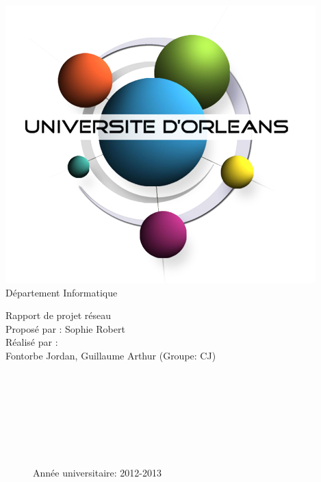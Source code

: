 \documentclass[12pt,a4paper,utf8x]{report}
\begin{document}
\begin{titlepage}
\begin{flushright}
   	\includegraphics[scale=0.30]{univorleans.png}\\ 
   	   	Département Informatique
\end{flushright}
\vspace{30mm}
\begin{center}
\huge{Rapport de projet réseau}\\
\vspace{8mm}
\vspace{3mm}
\large{Proposé par : Sophie Robert}
\vspace{3mm}
\large{\\Réalisé par :}\\
\large{Fontorbe Jordan, Guillaume Arthur (Groupe: CJ)}\\
\end{center}
\begin{figure}[b!]
\begin{flushright}
~~\\ ~~\\ ~~\\ ~~\\ ~~\\ ~~\\ ~~\\
\large{Année universitaire: 2012-2013}
\end{flushright}
\end{figure}
\end{titlepage}
\end{document}
